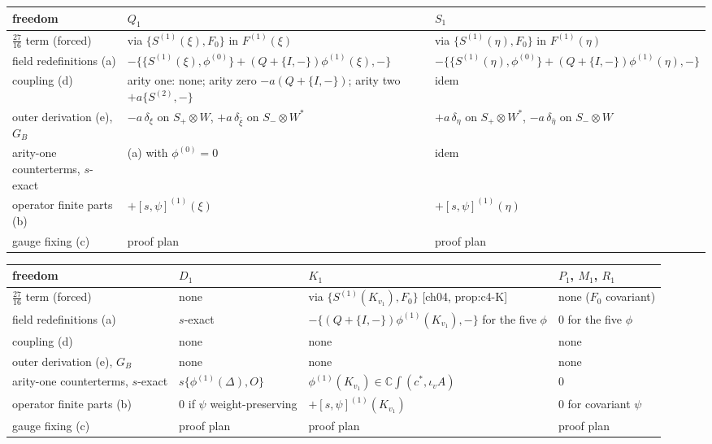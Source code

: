 \begin{tabular}{l|l|l}
freedom & $Q_1$ & $S_1$ \\
\hline
$\tfrac{27}{16}$ term (forced) & via $\{S^{(1)}(\xi),F_0\}$ in $F^{(1)}(\xi)$ & via $\{S^{(1)}(\eta),F_0\}$ in $F^{(1)}(\eta)$ \\
field redefinitions (a) & $-\{\{S^{(1)}(\xi),\phi^{(0)}\}+(Q+\{I,-\})\phi^{(1)}(\xi),-\}$ & $-\{\{S^{(1)}(\eta),\phi^{(0)}\}+(Q+\{I,-\})\phi^{(1)}(\eta),-\}$ \\
coupling (d) & arity one: none; arity zero $-a(Q+\{I,-\})$; arity two $+a\{S^{(2)},-\}$ & idem \\
outer derivation (e), $G_B$ & $-a\,\delta_\xi$ on $S_+\otimes W$, $+a\,\delta_{\bar\xi}$ on $S_-\otimes W^*$ & $+a\,\delta_\eta$ on $S_+\otimes W^*$, $-a\,\delta_{\bar\eta}$ on $S_-\otimes W$ \\
arity-one counterterms, $s$-exact & (a) with $\phi^{(0)}=0$ & idem \\
operator finite parts (b) & $+[s,\psi]^{(1)}(\xi)$ & $+[s,\psi]^{(1)}(\eta)$ \\
gauge fixing (c) & proof plan & proof plan \\
\end{tabular}

\begin{tabular}{l|l|l|l}
freedom & $D_1$ & $K_1$ & $P_1$, $M_1$, $R_1$ \\
\hline
$\tfrac{27}{16}$ term (forced) & none & via $\{S^{(1)}(K_{v_1}),F_0\}$ [ch04, prop:c4-K] & none ($F_0$ covariant) \\
field redefinitions (a) & $s$-exact & $-\{(Q+\{I,-\})\phi^{(1)}(K_{v_1}),-\}$ for the five $\phi$ & $0$ for the five $\phi$ \\
coupling (d) & none & none & none \\
outer derivation (e), $G_B$ & none & none & none \\
arity-one counterterms, $s$-exact & $s\{\phi^{(1)}(\Delta),O\}$ & $\phi^{(1)}(K_{v_1})\in\mathbb C\int(c^*,\iota_vA)$ & $0$ \\
operator finite parts (b) & $0$ if $\psi$ weight-preserving & $+[s,\psi]^{(1)}(K_{v_1})$ & $0$ for covariant $\psi$ \\
gauge fixing (c) & proof plan & proof plan & proof plan \\
\end{tabular}


